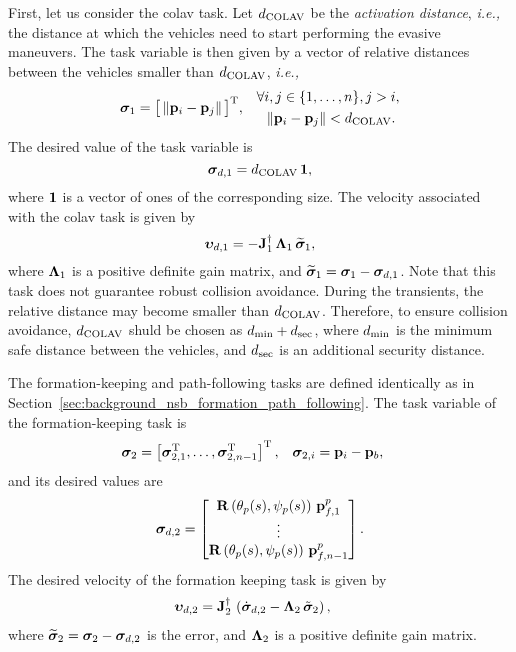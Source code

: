 First, let us consider the \gls{colav} task.
Let {$d_{\rm COLAV}$} be the \emph{activation distance}, \emph{i.e.,} the distance at which the vehicles need to start performing the evasive maneuvers.
The task variable is then given by a vector of relative distances between the vehicles smaller than $d_{\rm COLAV}$, \emph{i.e.,}
\begin{align}
        \bm{\sigma}_1 &= \big[\left\|\mathbf{p}_i - \mathbf{p}_j\right\|\big]^{\mathrm{T}}, &
        \begin{split} 
            \forall &i,j\in\{1,\ldots,n\}, j > i, \\
            &\left\|\mathbf{p}_i - \mathbf{p}_j\right\| < d_{\rm COLAV}.
        \end{split}
\end{align}
The desired value of the task variable is
\begin{equation}
    \bm{\sigma}_{d,1} = d_{\rm COLAV} \, \mathbf{1},
\end{equation}
where $\mathbf{1}$ is a vector of ones of the corresponding size.
The velocity associated with the \gls{colav} task is given by
\begin{equation}
    \bm{\upsilon}_{d,1} = - \mathbf{J}_1^{\dagger}\, \bm{\Lambda}_1\,\widetilde{\bm{\sigma}}_1,
\end{equation}
where $\bm{\Lambda}_1$ is a positive definite gain matrix, and $\widetilde{\bm{\sigma}}_1 = \bm{\sigma}_1 - \bm{\sigma}_{d,1}$.
Note that this task does not guarantee robust collision avoidance.
During the transients, the relative distance may become smaller than $d_{\rm COLAV}$.
Therefore, to ensure collision avoidance, $d_{\rm COLAV}$ shuld be chosen as $d_{\rm min} + d_{\rm sec}$, where $d_{\rm min}$ is the minimum safe distance between the vehicles, and $d_{\rm sec}$ is an additional security distance.

The formation-keeping and path-following tasks are defined identically as in Section~\ref{sec:background_nsb_formation_path_following}.
The task variable of the formation-keeping task is
\begin{align}
    \bm{\sigma}_2 &= \left[\bm{\sigma}_{2,1}^{\mathrm{T}}, \ldots, \bm{\sigma}_{2,n-1}^{\mathrm{T}}\right]^{\mathrm{T}}, \label{eq:nsb_5dof_sigma_2} &
    \bm{\sigma}_{2,i} &= \mathbf{p}_i - \mathbf{p}_b,
\end{align}
and its desired values are
\begin{equation}
    \bm{\sigma}_{d,2} = \begin{bmatrix}
        \mathbf{R}\left(\theta_p(s), \psi_p(s)\right)\,\mathbf{p}_{f,1}^p \\
        \vdots \\
        \mathbf{R}\left(\theta_p(s), \psi_p(s)\right)\,\mathbf{p}_{f,n-1}^p
    \end{bmatrix}. \label{eq:nsb_5dof_sigma_d_2}
\end{equation}
The desired velocity of the formation keeping task is given by
\begin{align}
    \bm{\upsilon}_{d,2} &= \mathbf{J}_2^{\dagger}\,\left(\dot{\bm{\sigma}}_{d,2} - \bm{\Lambda}_2\,\tilde{\bm{\sigma}}_2\right), \label{eq:nsb_5dof_CLIK}
\end{align}
where $\widetilde{\bm{\sigma}}_2 = \bm{\sigma}_2 - \bm{\sigma}_{d,2}$ is the error, and $\mathbf{\Lambda}_2$ is a positive definite gain matrix.


